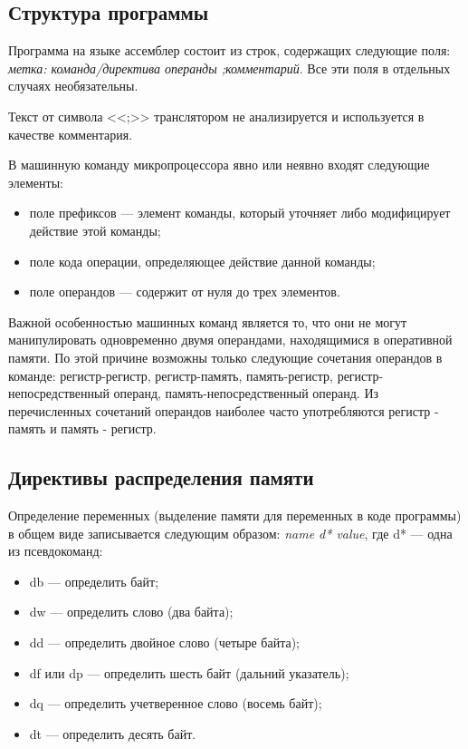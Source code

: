 \subsection{Структура программы}

Программа на языке ассемблер состоит из строк, содержащих следующие поля:
\textit{метка: команда/директива операнды ;комментарий}.
Все эти поля в отдельных случаях необязательны. 

Текст от символа <<;>> транслятором не анализируется и используется
в качестве комментария.

В машинную команду микропроцессора явно или неявно входят следующие элементы:

\begin{itemize}
\item поле префиксов --- элемент команды, который уточняет либо модифицирует действие этой
  команды;
\item поле кода операции, определяющее действие данной команды;
\item поле операндов --- содержит от нуля до трех элементов.
\end{itemize}

Важной особенностью машинных команд является то, что они не могут манипулировать
одновременно двумя операндами, находящимися в оперативной памяти. По этой причине
возможны только следующие сочетания операндов в команде:
регистр-регистр,
регистр-память,
память-регистр,
регистр-непосредственный операнд,
память-непосредственный операнд.
Из перечисленных сочетаний операндов наиболее часто употребляются регистр - память и
память - регистр.


\subsection{Директивы распределения памяти}

Определение переменных (выделение памяти для переменных в коде программы) в общем
виде записывается следующим образом: \textit{name d* value},
где d* --- одна из псевдокоманд:
\begin{itemize}
\item db --- определить байт;
\item dw --- определить слово (два байта);
\item dd --- определить двойное слово (четыре байта);
\item df или dp --- определить шесть байт (дальний указатель);
\item dq --- определить учетверенное слово (восемь байт);
\item dt --- определить десять байт.
\end{itemize}

